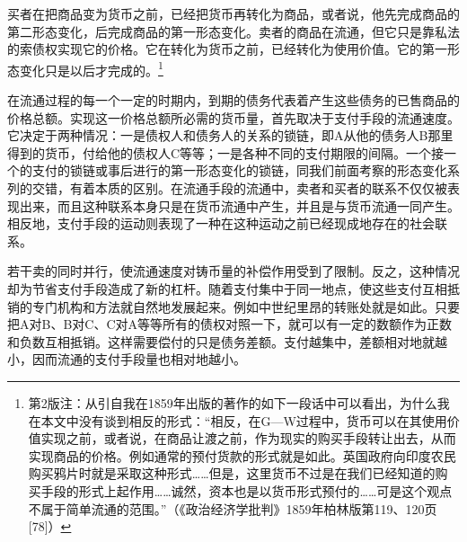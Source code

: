 \documentclass{ctexbook}
\begin{document}
        买者在把商品变为货币之前，已经把货币再转化为商品，或者说，他先完成商品的第二形态变化，后完成商品的第一形态变化。卖者的商品在流通，但它只是靠私法的索债权实现它的价格。它在转化为货币之前，已经转化为使用价值。它的第一形态变化只是以后才完成的。\footnote{第2版注：从引自我在1859年出版的著作的如下一段话中可以看出，为什么我在本文中没有谈到相反的形式：“相反，在G—W过程中，货币可以在其使用价值实现之前，或者说，在商品让渡之前，作为现实的购买手段转让出去，从而实现商品的价格。例如通常的预付货款的形式就是如此。英国政府向印度农民购买鸦片时就是采取这种形式……但是，这里货币不过是在我们已经知道的购买手段的形式上起作用……诚然，资本也是以货币形式预付的……可是这个观点不属于简单流通的范围。”（《政治经济学批判》1859年柏林版第119、120页[78]）}

        在流通过程的每一个一定的时期内，到期的债务代表着产生这些债务的已售商品的价格总额。实现这一价格总额所必需的货币量，首先取决于支付手段的流通速度。它决定于两种情况：一是债权人和债务人的关系的锁链，即A从他的债务人B那里得到的货币，付给他的债权人C等等；一是各种不同的支付期限的间隔。一个接一个的支付的锁链或事后进行的第一形态变化的锁链，同我们前面考察的形态变化系列的交错，有着本质的区别。在流通手段的流通中，卖者和买者的联系不仅仅被表现出来，而且这种联系本身只是在货币流通中产生，并且是与货币流通一同产生。相反地，支付手段的运动则表现了一种在这种运动之前已经现成地存在的社会联系。

        若干卖的同时并行，使流通速度对铸币量的补偿作用受到了限制。反之，这种情况却为节省支付手段造成了新的杠杆。随着支付集中于同一地点，使这些支付互相抵销的专门机构和方法就自然地发展起来。例如中世纪里昂的转账处就是如此。只要把A对B、B对C、C对A等等所有的债权对照一下，就可以有一定的数额作为正数和负数互相抵销。这样需要偿付的只是债务差额。支付越集中，差额相对地就越小，因而流通的支付手段量也相对地越小。
\end{document}
